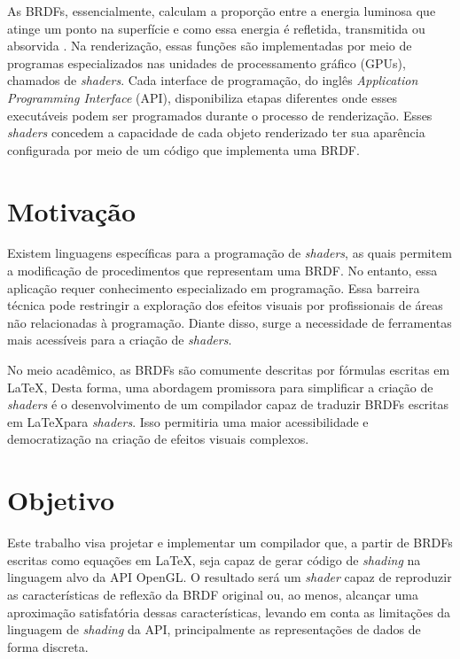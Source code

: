 \documentclass[english, 
               brazil, 
               bsc] %
               {dcomp-abntex2}
\begin{document}
As BRDFs, essencialmente, calculam a proporção entre a energia luminosa que atinge um ponto na superfície e como essa energia é refletida, transmitida ou absorvida \cite{pbr}. Na renderização, essas funções são implementadas por meio de programas especializados nas unidades de processamento gráfico (GPUs), chamados de \textit{shaders}. Cada interface de programação, do inglês \textit{ Application Programming Interface} (API),  disponibiliza etapas diferentes onde esses executáveis podem ser programados durante o processo de renderização. Esses \textit{shaders} concedem a capacidade de cada objeto renderizado ter sua aparência configurada por meio de um código que implementa uma BRDF.




\section{Motivação}




Existem linguagens específicas para a programação de \textit{shaders}, as quais permitem a modificação de procedimentos que representam uma BRDF. No entanto, essa aplicação requer conhecimento especializado em programação. Essa barreira técnica pode restringir a exploração dos efeitos visuais por profissionais de áreas não relacionadas à programação. Diante disso, surge a necessidade de ferramentas mais acessíveis para a criação de \textit{shaders}.


No meio acadêmico, as BRDFs são comumente descritas por fórmulas escritas em \LaTeX, Desta forma, uma abordagem promissora para simplificar a criação de \textit{shaders} é o desenvolvimento de um compilador capaz de traduzir BRDFs   escritas em \LaTeX  para \textit{shaders}. Isso permitiria uma maior acessibilidade e democratização na criação de efeitos visuais complexos.


\section{Objetivo}
Este trabalho visa projetar e implementar um compilador que, a partir de BRDFs escritas como equações em \LaTeX, seja capaz de gerar código de \textit{shading} na linguagem alvo da API OpenGL. O resultado será um \textit{shader} capaz de reproduzir as características de reflexão da BRDF original ou, ao menos, alcançar uma aproximação satisfatória dessas características, levando em conta as limitações da linguagem de \textit{shading} da API, principalmente as representações de dados de forma discreta. 
\end{document}
